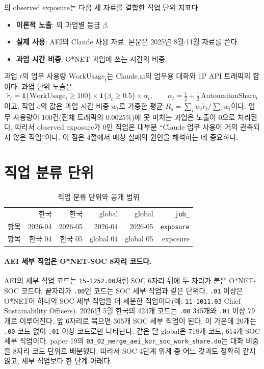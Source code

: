 \documentclass[11pt]{article}
\begin{document}
\textcite{massenkoff-2026-labor-market-impacts-of-ai}의 observed exposure는 다음 세 자료를 결합한 직업 단위 지표다.
\begin{itemize}[leftmargin=*]
  \item \textbf{이론적 노출}: \textcite{eloundou-2023-gpts-are-gpts-an-early}의 과업별 등급 $\beta$.
  \item \textbf{실제 사용}: AEI의 Claude 사용 자료. 본문은 2025년 8월$\cdot$11월 자료를 쓴다.
  \item \textbf{과업 시간 비중}: O*NET 과업에 쓰는 시간의 비중.
\end{itemize}
과업 $t$의 업무 사용량 $\text{WorkUsage}_t$는 Claude.ai의 업무용 대화와 1P API 트래픽의 합이다. 과업 단위 노출은
\[
\tilde r_t = \mathbf{1}\{\text{WorkUsage}_t \ge 100\}\times \mathbf{1}\{\beta_t \ge 0.5\}\times \alpha_t,\qquad \alpha_t = \tfrac12 + \tfrac12\,\text{AutomationShare}_t
\]
이고, 직업 $o$의 값은 과업 시간 비중 $w_t$로 가중한 평균 $R_o=\sum_t w_t \tilde r_t / \sum_t w_t$이다. 업무 사용량이 100건(전체 트래픽의 0.0025\%)에 못 미치는 과업은 노출이 0으로 처리된다. 따라서 observed exposure가 0인 직업은 대부분 ``Claude 업무 사용이 거의 관측되지 않은 직업''이다. 이 점은 4절에서 매칭 실패의 원인을 해석하는 데 중요하다.

\section{직업 분류 단위}

\begin{longtable}{L{6.0cm}rrrrr}
\caption{직업 분류 단위와 공개 범위}\label{tab:units}\\
\toprule
 & 한국 & 한국 & global & global & \texttt{job\_} \\
항목 & 2026-04 & 2026-05 & 2026-04 & 2026-05 & \texttt{exposure} \\
\midrule
\endfirsthead
\toprule
항목 & 한국 04 & 한국 05 & global 04 & global 05 & exposure \\
\midrule
\endhead

\bottomrule
\end{longtable}

\paragraph{AEI 세부 직업은 O*NET-SOC 8자리 코드다.} AEI의 세부 직업 코드는 \texttt{15-1252.00}처럼 SOC 6자리 뒤에 두 자리가 붙은 O*NET-SOC 코드다. 끝자리가 \texttt{.00}인 코드는 SOC 세부 직업과 같은 단위다. \texttt{.01} 이상은 O*NET이 하나의 SOC 세부 직업을 더 세분한 직업이다(예: \texttt{11-1011.03} Chief Sustainability Officers). 2026년 5월 한국의 424개 코드는 \texttt{.00} 345개와 \texttt{.01} 이상 79개로 이루어진다. 앞 6자리로 묶으면 365개 SOC 세부 직업이 된다. 이 가운데 20개는 \texttt{.00} 코드 없이 \texttt{.01} 이상 코드로만 나타난다. 같은 달 global은 718개 코드, 614개 SOC 세부 직업이다. paper 19의 \texttt{03\_02\_merge\_aei\_kor\_soc\_work\_share.do}는 대화 비중을 8자리 코드 단위로 배분했다. 따라서 SOC 4단계 위계 중 어느 것과도 정확히 같지 않고, 세부 직업보다 한 단계 아래다.
\end{document}

